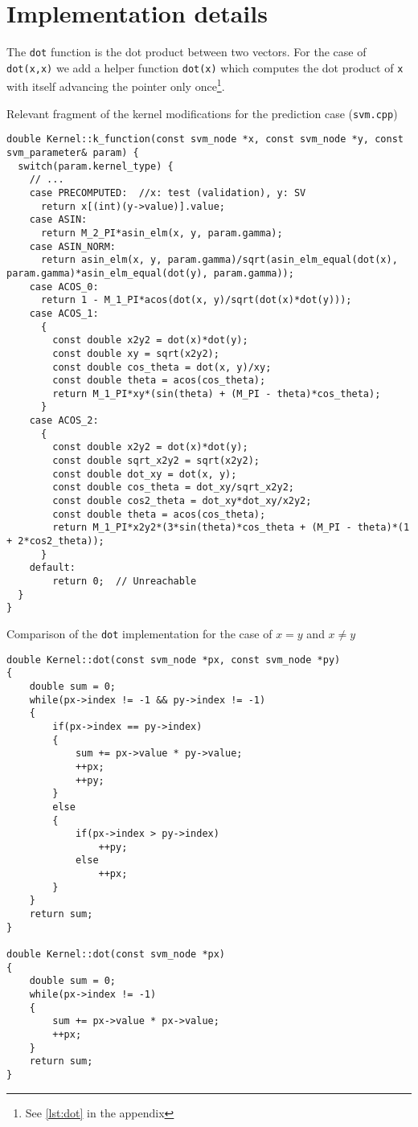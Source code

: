 \section{Implementation details}

The \texttt{dot} function is the dot product between two vectors. For the case
of \texttt{dot(x,x)} we add a helper function \texttt{dot(x)}
which computes the dot product of \texttt{x} with itself advancing the pointer
only once\footnote{See \cref{lst:dot} in the appendix}.

\begin{listing}
    \caption{Relevant fragment of the kernel modifications for the prediction case (\texttt{svm.cpp})}
    \label{lst:svm_cpp_k_function}
    \begin{verbatim}
double Kernel::k_function(const svm_node *x, const svm_node *y, const svm_parameter& param) {
  switch(param.kernel_type) {
    // ...
    case PRECOMPUTED:  //x: test (validation), y: SV
      return x[(int)(y->value)].value;
    case ASIN:
      return M_2_PI*asin_elm(x, y, param.gamma);
    case ASIN_NORM:
      return asin_elm(x, y, param.gamma)/sqrt(asin_elm_equal(dot(x), param.gamma)*asin_elm_equal(dot(y), param.gamma));
    case ACOS_0:
      return 1 - M_1_PI*acos(dot(x, y)/sqrt(dot(x)*dot(y)));
    case ACOS_1:
      {
        const double x2y2 = dot(x)*dot(y);
        const double xy = sqrt(x2y2);
        const double cos_theta = dot(x, y)/xy;
        const double theta = acos(cos_theta);
        return M_1_PI*xy*(sin(theta) + (M_PI - theta)*cos_theta);
      }
    case ACOS_2:
      {
        const double x2y2 = dot(x)*dot(y);
        const double sqrt_x2y2 = sqrt(x2y2);
        const double dot_xy = dot(x, y);
        const double cos_theta = dot_xy/sqrt_x2y2;
        const double cos2_theta = dot_xy*dot_xy/x2y2;
        const double theta = acos(cos_theta);
        return M_1_PI*x2y2*(3*sin(theta)*cos_theta + (M_PI - theta)*(1 + 2*cos2_theta));
      }
    default:
        return 0;  // Unreachable
  }
}
\end{verbatim}
\end{listing}

\begin{listing}
    \caption{Comparison of the \texttt{dot} implementation for the case of $x = y$ and $x \neq y$}
    \label{lst:dot}
    \begin{verbatim}
double Kernel::dot(const svm_node *px, const svm_node *py)
{
    double sum = 0;
    while(px->index != -1 && py->index != -1)
    {
        if(px->index == py->index)
        {
            sum += px->value * py->value;
            ++px;
            ++py;
        }
        else
        {
            if(px->index > py->index)
                ++py;
            else
                ++px;
        }
    }
    return sum;
}

double Kernel::dot(const svm_node *px)
{
    double sum = 0;
    while(px->index != -1)
    {
        sum += px->value * px->value;
        ++px;
    }
    return sum;
}
\end{verbatim}
\end{listing}
